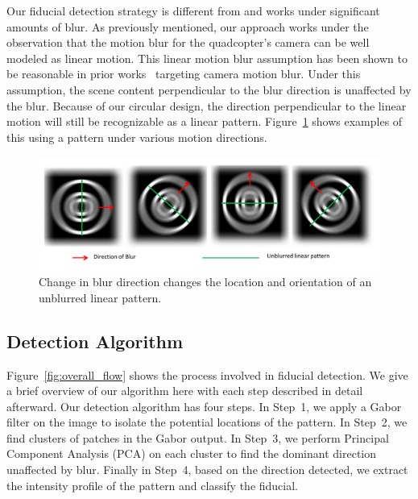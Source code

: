 Our fiducial detection strategy is different from
\cite{NaimarkF02,Pitag13} and works under significant amounts of blur.
As previously mentioned, our approach works under the observation that
the motion blur for the quadcopter's camera can be well modeled as
linear motion.  This linear motion blur assumption has been shown to
be reasonable in prior works~\cite{Moshe:2003,Moshe:2004}
targeting camera motion blur. Under this assumption, the scene
content perpendicular to the blur direction is unaffected by the blur.
Because of our circular design, the direction perpendicular to the
linear motion will still be recognizable as a linear pattern.
Figure~\ref{fig:blur_direction} shows examples of this using a pattern
under 
various motion directions.

\begin{figure}[h!]
\centering
\includegraphics[width=\linewidth]{figures/fiducial/blur_direction}
\caption{Change in blur direction changes the location and orientation
  of an unblurred linear pattern.}
\label{fig:blur_direction}
\end{figure}


\subsection{Detection Algorithm}

Figure~\ref{fig:overall_flow} shows the process involved in fiducial
detection. We give a brief overview of our algorithm here with each
step described in detail afterward.  Our detection algorithm has four
steps. In Step~1, we apply a Gabor filter on the image to isolate the
potential locations of the pattern.  In Step~2, we find clusters of
patches in the Gabor output.  In Step~3, we perform Principal
Component Analysis (PCA) on each cluster to find the dominant
direction unaffected by blur.  Finally in Step~4, based on the
direction detected, we extract the intensity profile of the pattern
and classify the fiducial. 

